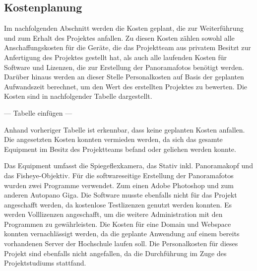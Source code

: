 \subsection{Kostenplanung}
\label{sec:Kostenplanung}

Im nachfolgenden Abschnitt werden die Kosten geplant, die zur Weiterführung und zum Erhalt des Projektes anfallen. Zu 
diesen Kosten zählen sowohl alle Anschaffungskosten für die Geräte, die das Projektteam aus privatem Besitzt zur 
Anfertigung des Projektes gestellt hat, als auch alle laufenden Kosten für Software und Lizenzen, die zur Erstellung der 
Panoramafotos benötigt werden. 
Darüber hinaus werden an dieser Stelle Personalkosten auf Basis der geplanten Aufwandszeit berechnet, um den Wert des 
erstellten Projektes zu bewerten.
Die Kosten sind in nachfolgender Tabelle dargestellt.

--- Tabelle einfügen ---

Anhand vorheriger Tabelle ist erkennbar, dass keine geplanten Kosten anfallen.
Die angesetzten Kosten konnten vermieden werden, da sich das gesamte Equipment im Besitz des Projektteams befand oder 
geliehen werden konnte.

Das Equipment umfasst die Spiegeflexkamera, das Stativ inkl. 
Panoramakopf und das Fisheye-Objektiv. Für die softwareseitige 
Erstellung der Panoramafotos wurden zwei Programme verwendet. Zum einen Adobe Photoshop und zum anderen Autopano Giga. 
Die Software musste ebenfalls nicht für das Projekt angeschafft werden, da kostenlose
Testlizenzen genutzt werden konnten. Es 
werden Volllizenzen angeschafft, um die weitere Administration mit den Programmen zu gewährleisten.
Die Kosten für eine Domain und Webspace konnten vernachlässigt werden, da die geplante Anwendung auf einem bereits 
vorhandenen Server der Hochschule laufen soll.
Die Personalkosten für dieses Projekt sind ebenfalls nicht angefallen, da die Durchführung im Zuge des Projektstudiums 
stattfand.
